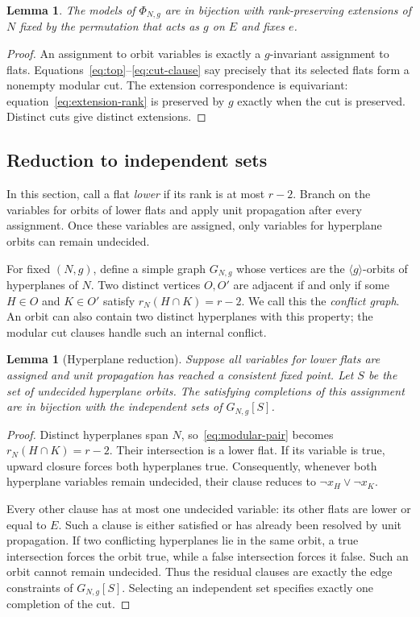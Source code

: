 \documentclass[11pt]{article}
\newtheorem{lemma}[theorem]{Lemma}
\theoremstyle{definition}
\begin{document}
\begin{lemma}\label{lem:invariant-cuts}
The models of $\Phi_{N,g}$ are in bijection with rank-preserving extensions
of $N$ fixed by the permutation that acts as $g$ on $E$ and fixes $e$.
\end{lemma}
\begin{proof}
An assignment to orbit variables is exactly a $g$-invariant assignment to
flats. Equations~\eqref{eq:top}--\eqref{eq:cut-clause} say precisely that its
selected flats form a nonempty modular cut. The extension correspondence
is equivariant: equation~\eqref{eq:extension-rank} is preserved by $g$
exactly when the cut is preserved. Distinct cuts give distinct extensions.
\end{proof}

\subsection{Reduction to independent sets}

In this section, call a flat \emph{lower} if its rank is at most $r-2$.
Branch on the variables for orbits of lower flats and apply unit propagation
after every assignment. Once these variables are assigned, only variables
for hyperplane orbits can remain undecided.

For fixed $(N,g)$, define a simple graph $G_{N,g}$ whose vertices are the
$\langle g\rangle$-orbits of hyperplanes of $N$. Two distinct vertices
$O,O'$ are adjacent if and only if some $H\in O$ and $K\in O'$ satisfy
$r_N(H\cap K)=r-2$. We call this the \emph{conflict graph}.
An orbit can also contain two distinct hyperplanes with this property;
the modular cut clauses handle such an internal conflict.

\begin{lemma}[Hyperplane reduction]\label{lem:hyperplanes}
Suppose all variables for lower flats are assigned and unit propagation
has reached a consistent fixed point. Let $S$ be the set of undecided
hyperplane orbits. The satisfying completions of this assignment are in
bijection with the independent sets of $G_{N,g}[S]$.
\end{lemma}
\begin{proof}
Distinct hyperplanes span $N$, so~\eqref{eq:modular-pair} becomes
$r_N(H\cap K)=r-2$. Their intersection is a lower flat. If its variable
is true, upward closure forces both hyperplanes true. Consequently, whenever
both hyperplane variables remain undecided, their clause reduces
to $\neg x_H\lor\neg x_K$.

Every other clause has at most one undecided variable: its other flats are
lower or equal to $E$. Such a clause is either satisfied or has already
been resolved by unit propagation. If two conflicting hyperplanes lie in the
same orbit, a true intersection forces the orbit true, while a false
intersection forces it false. Such an orbit cannot remain undecided.
Thus the residual clauses are exactly the edge constraints of $G_{N,g}[S]$.
Selecting an independent set specifies exactly one completion of the cut.
\end{proof}
\end{document}
